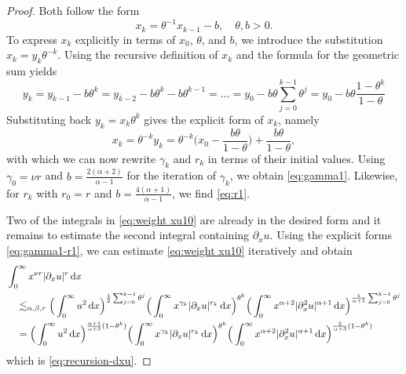 \documentclass[reqno,12pt]{amsart}
\renewcommand{\d}{\ensuremath{\mathrm{d}}}
\renewcommand{\d}{\ensuremath{{\rm d}}}
\numberwithin{equation}{section}
\begin{document}
\begin{proof}
%
Both follow the form 
%
\begin{equation*}
	x_k= \theta^{-1} x_{k-1} -b, \quad \theta,b > 0. 
\end{equation*}
%
To express $x_k$ explicitly in terms of $x_0$, $\theta$, and $b$, we introduce the substitution $x_k = y_k \theta^{-k}$. Using the recursive definition of $x_k$ and the formula for the geometric sum yields
%
\begin{equation*}
	y_k = y_{k-1} - b \theta^k = y_{k-2} - b \theta^k - b \theta^{k-1} = \dots = y_0 - b \theta \sum_{j=0}^{k-1} \theta^j = y_0 - b \theta \frac{1-\theta^k}{1-\theta} 
\end{equation*}
%
Substituting back $y_k = x_k \theta^{k}$ gives the explicit form of $x_k$, namely
%
\begin{equation*}
	x_k= \theta^{-k} y_k = \theta^{-k} \Big( x_0 - \frac{b \theta}{1-\theta} \Big) + \frac{b \theta}{1-\theta},
\end{equation*}
%
with which we can now rewrite $\gamma_k$ and $r_k$ in terms of their initial values. Using $\gamma_0 = \nu r$ and $b = \frac{2(\alpha+2)}{\alpha-1}$ for the iteration of $\gamma_k$, we obtain \eqref{eq:gamma1}. Likewise, for \(r_k\) with $r_0 = r$ and \(b=\frac{4(\alpha +1)}{\alpha -1}\), we find \eqref{eq:r1}. 

%
\medskip
%

Two of the integrals in \eqref{eq:weight xu10} are already in the desired form and it remains to estimate the second integral containing $\partial_x u$. Using the explicit forms \eqref{eq:gamma1-r1}, we can estimate \eqref{eq:weight xu10} iteratively and obtain
%
\begin{equation*}
\begin{split}
 & \int_0^\infty x^{\nu r} |\partial_x u|^{r}\, \d x \\
 & \quad \lesssim_{\alpha,\beta,r}  \Big(  \int_0^\infty  u^2 \, \d x \Big)^{\frac{1}{2}\sum_{j=0}^{k-1}\theta^j}
\Big( \int_0^\infty x^{\gamma_k}
 |\partial_x u|^{r_k} \, \d x \Big)^{\theta^k}
 \Big( \int_0^\infty  x^{\alpha+2} |\partial_x^2 u|^{\alpha+1} \, \d x\Big)^{\frac{1}{\alpha+1}\sum_{j=0}^{k-1}\theta^j}
 \\
& \quad = \Big(  \int_0^\infty  u^2 \, \d x \Big)^{\frac{\alpha+1}{\alpha+3}(  1-\theta^k)}
\Big( \int_0^\infty x^{\gamma_k}
|\partial_x u|^{r_k} \, \d x \Big)^{\theta^k}
\Big( \int_0^\infty  x^{\alpha+2} |\partial_x^2 u|^{\alpha+1} \, \d x\Big)^{\frac{2}{\alpha+3}(1- \theta^k)}
 \end{split}
 \end{equation*}
which is \eqref{eq:recursion-dxu}.
%
\end{proof}
%
\end{document}
